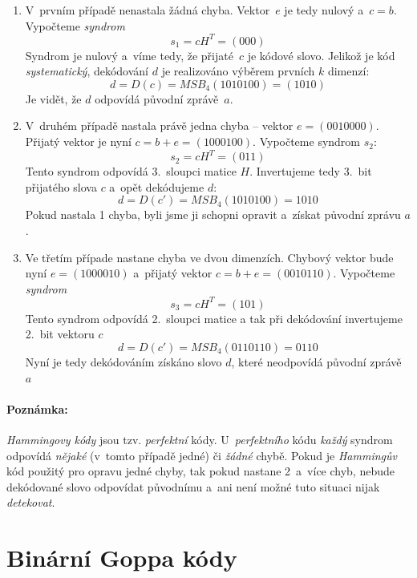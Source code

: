 \documentclass[thesis=M,czech,hidelinks]{FITthesis}[2012/06/26]
\newcommand{\0}{{\textcolor[gray]{0.75}{0}}}
\begin{document}
\begin{enumerate}
    \item V~prvním případě nenastala žádná chyba. Vektor~$e$ je
        tedy nulový a~$c = b$. Vypočteme \emph{syndrom}
        $$ s_1 = c H^T = (000) $$
        Syndrom je nulový a~víme tedy, že přijaté~$c$ je kódové slovo.
        Jelikož je kód \emph{systematický}, dekódování $d$ je realizováno
        výběrem prvních $k$ dimenzí:
        $$ d = D(c) = MSB_4(1010100) = (1010) $$
        Je vidět, že $d$ odpovídá původní zprávě~$a$.

    \item V~druhém případě nastala právě jedna chyba -- vektor $e=(0010000)$.
        Přijatý vektor je nyní $c = b + e = (1000100)$. Vypočteme syndrom $s_2$:
        $$ s_2 = c H^T = (011) $$
        Tento syndrom odpovídá 3.~sloupci matice $H$. Invertujeme tedy 3.~bit
        přijatého slova $c$ a~opět dekódujeme $d$:
        $$ d = D(c') = MSB_4(1010100) = 1010 $$
        Pokud nastala 1 chyba, byli jsme ji schopni opravit a~získat původní
        zprávu $a$.

    \item Ve třetím případe nastane chyba ve dvou dimenzích. Chybový vektor bude
        nyní $e=(1000010)$ a~přijatý vektor $c = b + e = (0010110)$. Vypočteme
        \emph{syndrom}
        $$ s_3 = c H^T = (101) $$
        Tento syndrom odpovídá 2.~sloupci matice a tak při dekódování
        invertujeme 2.~bit vektoru $c$
        $$ d = D(c') = MSB_4(0110110) = 0110 $$
        Nyní je tedy dekódováním získáno slovo $d$, které neodpovídá původní
        zprávě $a$

\end{enumerate}

\paragraph{Poznámka:} \emph{Hammingovy kódy} jsou tzv. \emph{perfektní} kódy.
U~\emph{perfektního} kódu \emph{každý} syndrom odpovídá \emph{nějaké} (v~tomto
případě jedné) či \emph{žádné} chybě. Pokud je \emph{Hammingův} kód použitý pro
opravu jedné chyby, tak pokud nastane 2~a~více chyb, nebude dekódované slovo
odpovídat původnímu a~ani není možné tuto situaci nijak \emph{detekovat}.



\section{Binární Goppa kódy}\label{kap_goppa_kody}
\end{document}
